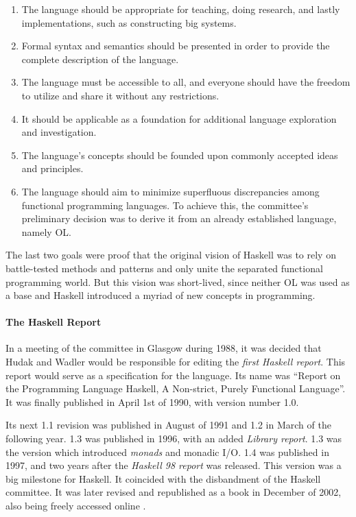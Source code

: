 \documentclass[a4paper, titlepage, twoside]{article}
\begin{document}
\begin{enumerate}
\item The language should be appropriate for teaching, doing research, and lastly implementations, such as constructing big systems.

\item Formal syntax and semantics should be presented in order to provide the complete description of the language.

\item The language must be accessible to all, and everyone should have the freedom to utilize and share it without any restrictions.

\item It should be applicable as a foundation for additional language exploration and investigation.

\item The language's concepts should be founded upon commonly accepted ideas and principles.

\item The language should aim to minimize superfluous discrepancies among functional programming languages. To achieve this, the committee's preliminary decision was to derive it from an already established language, namely OL.
\end{enumerate}

The last two goals were proof that the original vision of Haskell was to rely on battle-tested methods and patterns and only unite the separated functional programming world. But this vision was short-lived, since neither OL was used as a base and Haskell introduced a myriad of new concepts in programming.

\paragraph*{The Haskell Report}
\label{sec:orgeed4737}

In a meeting of the committee in Glasgow during 1988, it was decided that Hudak and Wadler would be responsible for editing the \emph{first Haskell report}. This report would serve as a specification for the language. Its name was ``Report on the Programming Language Haskell, A Non-strict, Purely Functional Language''. It was finally published in April 1st of 1990, with version number 1.0.

Its next 1.1 revision was published in August of 1991 and 1.2 in March of the following year. 1.3 was published in 1996, with an added \emph{Library report}. 1.3 was the version which introduced \emph{monads} and monadic I/O. 1.4 was published in 1997, and two years after the \emph{Haskell 98 report} was released. This version was a big milestone for Haskell. It coincided with the disbandment of the Haskell committee. It was later revised and republished as a book in December of 2002, also being freely accessed online \autocite{hudakHistoryHaskellBeing2007}.
\end{document}
